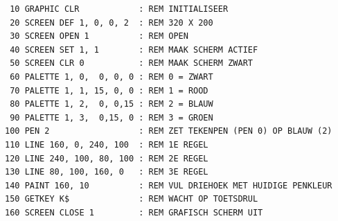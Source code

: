 \begin{description}[leftmargin=2cm,style=nextline]
\begin{tcolorbox}[colback=black,coltext=white]
\verbatimfont{\codefont}
\begin{verbatim}
 10 GRAPHIC CLR            : REM INITIALISEER
 20 SCREEN DEF 1, 0, 0, 2  : REM 320 X 200
 30 SCREEN OPEN 1          : REM OPEN
 40 SCREEN SET 1, 1        : REM MAAK SCHERM ACTIEF
 50 SCREEN CLR 0           : REM MAAK SCHERM ZWART
 60 PALETTE 1, 0,  0, 0, 0 : REM 0 = ZWART
 70 PALETTE 1, 1, 15, 0, 0 : REM 1 = ROOD
 80 PALETTE 1, 2,  0, 0,15 : REM 2 = BLAUW
 90 PALETTE 1, 3,  0,15, 0 : REM 3 = GROEN
100 PEN 2                  : REM ZET TEKENPEN (PEN 0) OP BLAUW (2)
110 LINE 160, 0, 240, 100  : REM 1E REGEL
120 LINE 240, 100, 80, 100 : REM 2E REGEL
130 LINE 80, 100, 160, 0   : REM 3E REGEL
140 PAINT 160, 10          : REM VUL DRIEHOEK MET HUIDIGE PENKLEUR
150 GETKEY K$              : REM WACHT OP TOETSDRUL
160 SCREEN CLOSE 1         : REM GRAFISCH SCHERM UIT
\end{verbatim}
\end{tcolorbox}
\end{description}


\newpage
